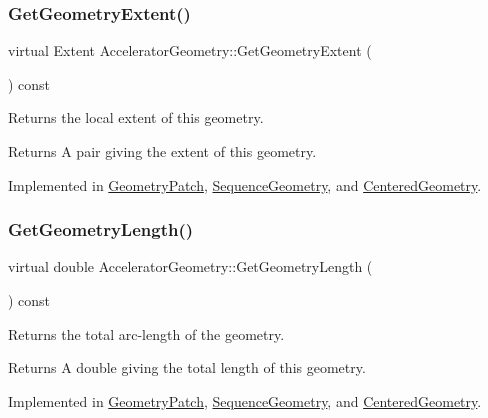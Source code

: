 \subsubsection{\texorpdfstring{Get\+Geometry\+Extent()}{GetGeometryExtent()}}
{\footnotesize\ttfamily virtual Extent Accelerator\+Geometry\+::\+Get\+Geometry\+Extent (\begin{DoxyParamCaption}{ }\end{DoxyParamCaption}) const\hspace{0.3cm}{\ttfamily [pure virtual]}}

Returns the local extent of this geometry. \begin{DoxyReturn}{Returns}
A pair giving the extent of this geometry. 
\end{DoxyReturn}


Implemented in \hyperlink{classGeometryPatch_a814a517dd837f92d7f26628562047cb2}{Geometry\+Patch}, \hyperlink{classSequenceGeometry_a1d904b73570a03e3496dbbd574b8fde0}{Sequence\+Geometry}, and \hyperlink{classCenteredGeometry_abd27afe15472ebd057d0b60f1d531a1a}{Centered\+Geometry}.

\mbox{\label{classAcceleratorGeometry_abc36f96d542e0d9db592f8e7ee455769}} 
\subsubsection{\texorpdfstring{Get\+Geometry\+Length()}{GetGeometryLength()}}
{\footnotesize\ttfamily virtual double Accelerator\+Geometry\+::\+Get\+Geometry\+Length (\begin{DoxyParamCaption}{ }\end{DoxyParamCaption}) const\hspace{0.3cm}{\ttfamily [pure virtual]}}

Returns the total arc-\/length of the geometry. \begin{DoxyReturn}{Returns}
A double giving the total length of this geometry. 
\end{DoxyReturn}


Implemented in \hyperlink{classGeometryPatch_ae2d9aef3fc3df96fdf0340124f099997}{Geometry\+Patch}, \hyperlink{classSequenceGeometry_a322e113ebda69e6c42af9415f3c964d9}{Sequence\+Geometry}, and \hyperlink{classCenteredGeometry_afe03a287567dec16f8663f4211f82add}{Centered\+Geometry}.

